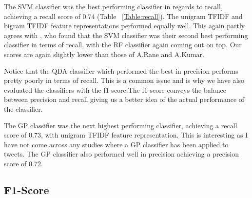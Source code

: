 The SVM classifier was the best performing classifier in regards to recall, achieving a recall score of 0.74 (Table ~\ref{Table:recall}). The unigram TFIDF and bigram TFIDF feature representations performed equally well. This again partly agrees with \cite{Rane2018}, who found that the SVM classifier was their second best performing classifier in terms of recall, with the RF classifier again coming out on top. Our scores are again slightly lower than those of A.Rane and A.Kumar.

Notice that the QDA classifier which performed the best in precision performs pretty poorly in terms of recall. This is a common issue and is why we have also evaluated the classifiers with the f1-score.The f1-score conveys the balance between precision and recall giving us a better idea of the actual performance of the classifier.

The GP classifier was the next highest performing classifier, achieving a recall score of 0.73, with unigram TFIDF feature representation. This is interesting as I have not come across any studies where a GP classifier has been applied to tweets. The GP classifier also performed well in precision achieving a precision score of 0.72.  

\subsection*{F1-Score}

